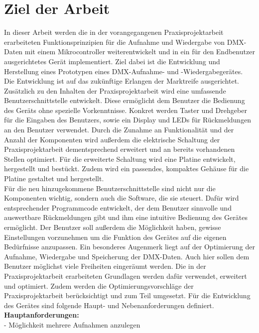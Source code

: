 
\newpage
\section{Ziel der Arbeit}
\label{sec:Ziel}
In dieser Arbeit werden die in der vorangegangenen Praxisprojektarbeit erarbeiteten Funktionsprinzipien für die Aufnahme und Wiedergabe von DMX-Daten mit einem Mikrocontroller weiterentwickelt und in ein für den Endbenutzer ausgerichtetes Gerät implementiert. Ziel dabei ist die Entwicklung und Herstellung eines Prototypen eines DMX-Aufnahme- und -Wiedergabegerätes. Die Entwicklung ist auf das zukünftige Erlangen der Marktreife ausgerichtet. Zusätzlich zu den Inhalten der Praxisprojektarbeit wird eine umfassende Benutzerschnittstelle entwickelt. Diese ermöglicht dem Benutzer die Bedienung des Geräts ohne spezielle Vorkenntnisse. Konkret werden Taster und Drehgeber für die Eingaben des Benutzers, sowie ein Display und LEDs für Rückmeldungen an den Benutzer verwendet. Durch die Zunahme an Funktionalität und der Anzahl der Komponenten wird außerdem die elektrische Schaltung der Praxisprojektarbeit dementsprechend erweitert und an bereits vorhandenen Stellen optimiert. Für die erweiterte Schaltung wird eine Platine entwickelt, hergestellt und bestückt. Zudem wird ein passendes, kompaktes Gehäuse für die Platine gestaltet und hergestellt.\\
Für die neu hinzugekommene Benutzerschnittstelle sind nicht nur die Komponenten wichtig, sondern auch die Software, die sie steuert. Dafür wird entsprechender Programmcode entwickelt, der dem Benutzer sinnvolle und auswertbare Rückmeldungen gibt und ihm eine intuitive Bedienung des Gerätes ermöglicht. Der Benutzer soll außerdem die Möglichkeit haben, gewisse Einstellungen vorzunehmen um die Funktion des Gerätes auf die eigenen Bedürfnisse anzupassen. Ein besonderes Augenmerk liegt auf der Optimierung der Aufnahme, Wiedergabe und Speicherung der DMX-Daten. Auch hier sollen dem Benutzer möglichst viele Freiheiten eingeräumt werden. Die in der Praxisprojektarbeit erarbeiteten Grundlagen werden dafür verwendet, erweitert und optimiert. Zudem werden die Optimierungsvorschläge der Praxisprojektarbeit berücksichtigt und zum Teil umgesetzt. Für die Entwicklung des Gerätes sind folgende Haupt- und Nebenanforderungen definiert.\\
\newline
\textbf{Hauptanforderungen:}\\
- Möglichkeit mehrere Aufnahmen anzulegen\\
